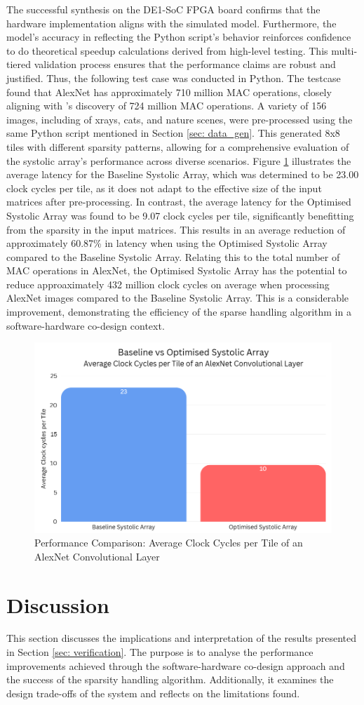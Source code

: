 \documentclass[12pt, a4paper, ukenglish]{article}
\newcommand{\performanceComparison}{
    \begin{figure}[ht]
        \centering
        \includegraphics[width=0.5\linewidth]{results/Performance Comparison - Average Clock Cycles per Tile of an AlexNet Convolutional Layer.png}
        \caption{Performance Comparison: Average Clock Cycles per Tile of an AlexNet Convolutional Layer}
        \label{fig:performance_comparison}
    \end{figure}
}
\begin{document}
    The successful synthesis on the DE1-SoC FPGA board confirms that the hardware implementation aligns with the simulated model. Furthermore, the model's accuracy in reflecting the Python script's behavior reinforces confidence to do theoretical speedup calculations derived from high-level testing. This multi-tiered validation process ensures that the performance claims are robust and justified. Thus, the following test case was conducted in Python.
    \newline
    The testcase found that AlexNet has approximately 710 million MAC operations, closely aligning with \textcite{tiwari_data_2022}'s discovery of 724 million MAC operations. A variety of 156 images, including of xrays, cats, and nature scenes, were pre-processed using the same Python script mentioned in Section \ref{sec: data_gen}. This generated 8x8 tiles with different sparsity patterns, allowing for a comprehensive evaluation of the systolic array's performance across diverse scenarios.
    \newline
    Figure \ref{fig:performance_comparison} illustrates the average latency for the Baseline Systolic Array, which was determined to be 23.00 clock cycles per tile, as it does not adapt to the effective size of the input matrices after pre-processing. In contrast, the average latency for the Optimised Systolic Array was found to be 9.07 clock cycles per tile, significantly benefitting from the sparsity in the input matrices. This results in an average reduction of approximately 60.87\% in latency when using the Optimised Systolic Array compared to the Baseline Systolic Array.
    \newline
    Relating this to the total number of MAC operations in AlexNet, the Optimised Systolic Array has the potential to reduce approaximately 432 million clock cycles on average when processing AlexNet images compared to the Baseline Systolic Array. This is a considerable improvement, demonstrating the efficiency of the sparse handling algorithm in a software-hardware co-design context. 
    
    

    
    \performanceComparison
    

\section{Discussion} \label{sec: discussion}
This section discusses the implications and interpretation of the results presented in Section \ref{sec: verification}. The purpose is to analyse the performance improvements achieved through the software-hardware co-design approach and the success of the sparsity handling algorithm. Additionally, it examines the design trade-offs of the system and reflects on the limitations found. 
\end{document}
